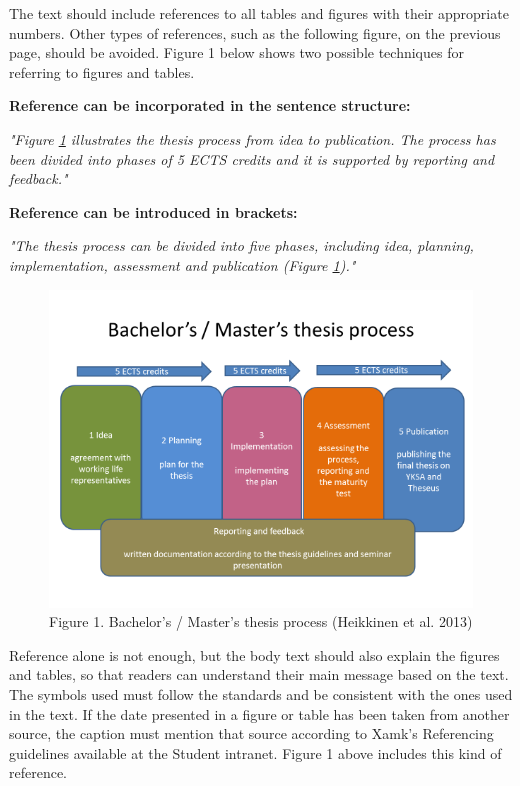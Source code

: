 \documentclass[12pt]{article}
\begin{document}
The text should include references to all tables and figures with their appropriate numbers. Other types of references, such as the following figure, on the previous page, should be avoided. Figure 1 below shows two possible techniques for referring to figures and tables.

\textbf{Reference can be incorporated in the sentence structure:}

\textit{"Figure \ref{bacpic} illustrates the thesis process from idea to publication. The process has been divided into phases of 5 ECTS credits and it is supported by reporting and feedback."}

\textbf{Reference can be introduced in brackets:}

\textit{"The thesis process can be divided into five phases, including idea, planning, implementation, assessment and publication (Figure \ref{bacpic})."}

\begin{figure}
	\includegraphics{Figure1.png}
	\caption{Figure 1. Bachelor’s / Master’s thesis process (Heikkinen et al. 2013)\label{bacpic}}
\end{figure}

Reference alone is not enough, but the body text should also explain the figures and tables, so that readers can understand their main message based on the text. The symbols used must follow the standards and be consistent with the ones used in the text. If the date presented in a figure or table has been taken from another source, the caption must mention that source according to Xamk’s Referencing guidelines available at the Student intranet. Figure 1 above includes this kind of reference.
\end{document}
